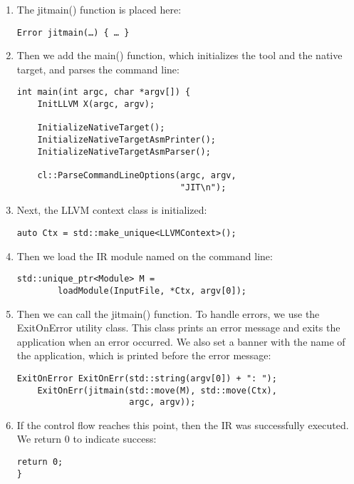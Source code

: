 \begin{enumerate}
\item The jitmain() function is placed here:
\begin{lstlisting}[caption={}]
Error jitmain(…) { … }
\end{lstlisting}

\item Then we add the main() function, which initializes the tool and the native target, 
and parses the command line:
\begin{lstlisting}[caption={}]
int main(int argc, char *argv[]) {
	InitLLVM X(argc, argv);
	
	InitializeNativeTarget();
	InitializeNativeTargetAsmPrinter();
	InitializeNativeTargetAsmParser();
	
	cl::ParseCommandLineOptions(argc, argv,
	     						"JIT\n");
\end{lstlisting}

\item Next, the LLVM context class is initialized:
\begin{lstlisting}[caption={}]
	auto Ctx = std::make_unique<LLVMContext>();
\end{lstlisting}

\item Then we load the IR module named on the command line:
\begin{lstlisting}[caption={}]
	std::unique_ptr<Module> M =
		loadModule(InputFile, *Ctx, argv[0]);
\end{lstlisting}

\item Then we can call the jitmain() function. To handle errors, we use the ExitOnError utility class. This class prints an error message and exits the application when an error occurred. We also set a banner with the name of the application, which is printed before the error message:
\begin{lstlisting}[caption={}]
	ExitOnError ExitOnErr(std::string(argv[0]) + ": ");
	ExitOnErr(jitmain(std::move(M), std::move(Ctx),
					  argc, argv));
\end{lstlisting}

\item If the control flow reaches this point, then the IR was successfully executed. We return 0 to indicate success:
\begin{lstlisting}[caption={}]
	return 0;
}
\end{lstlisting}

\end{enumerate}

